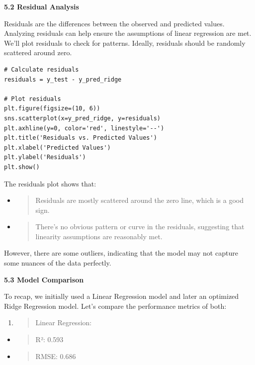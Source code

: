 \documentclass[]{article}
\begin{document}
\textbf{5.2 Residual Analysis}

Residuals are the differences between the observed and predicted values.
Analyzing residuals can help ensure the assumptions of linear regression
are met. We'll plot residuals to check for patterns. Ideally, residuals
should be randomly scattered around zero.

\begin{verbatim}
# Calculate residuals
residuals = y_test - y_pred_ridge

# Plot residuals
plt.figure(figsize=(10, 6))
sns.scatterplot(x=y_pred_ridge, y=residuals)
plt.axhline(y=0, color='red', linestyle='--')
plt.title('Residuals vs. Predicted Values')
plt.xlabel('Predicted Values')
plt.ylabel('Residuals')
plt.show()
\end{verbatim}

The residuals plot shows that:

\begin{itemize}
\item
  \begin{quote}
  Residuals are mostly scattered around the zero line, which is a good
  sign.
  \end{quote}
\item
  \begin{quote}
  There's no obvious pattern or curve in the residuals, suggesting that
  linearity assumptions are reasonably met.
  \end{quote}
\end{itemize}

However, there are some outliers, indicating that the model may not
capture some nuances of the data perfectly.

\textbf{5.3 Model Comparison}

To recap, we initially used a Linear Regression model and later an
optimized Ridge Regression model. Let's compare the performance metrics
of both:

\begin{enumerate}
\def\labelenumi{\arabic{enumi}.}
\item
  \begin{quote}
  Linear Regression:
  \end{quote}
\end{enumerate}

\begin{itemize}
\item
  \begin{quote}
  R²: 0.593
  \end{quote}
\item
  \begin{quote}
  RMSE: 0.686
  \end{quote}
\end{itemize}
\end{document}
